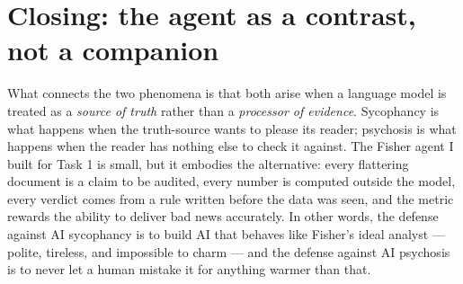 \documentclass[11pt,a4paper]{article}
\begin{document}
\section{Closing: the agent as a contrast, not a companion}

What connects the two phenomena is that both arise when a language model is
treated as a \emph{source of truth} rather than a \emph{processor of evidence}.
Sycophancy is what happens when the truth-source wants to please its reader;
psychosis is what happens when the reader has nothing else to check it against.
The Fisher agent I built for Task 1 is small, but it embodies the alternative:
every flattering document is a claim to be audited, every number is computed
outside the model, every verdict comes from a rule written before the data was
seen, and the metric rewards the ability to deliver bad news accurately. In
other words, the defense against AI sycophancy is to build AI that behaves
like Fisher's ideal analyst --- polite, tireless, and impossible to charm ---
and the defense against AI psychosis is to never let a human mistake it for
anything warmer than that.
\end{document}
